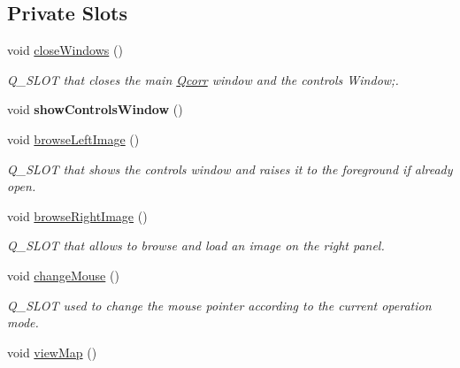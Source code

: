 \subsection*{Private Slots}
\begin{DoxyCompactItemize}
\item 
\hypertarget{classQcorr_a395de1dc21d85fa766fb6558c5e302e5}{
void \hyperlink{classQcorr_a395de1dc21d85fa766fb6558c5e302e5}{closeWindows} ()}
\label{classQcorr_a395de1dc21d85fa766fb6558c5e302e5}

\begin{DoxyCompactList}\small\item\em Q\_\-SLOT that closes the main \hyperlink{classQcorr}{Qcorr} window and the controls Window;. \item\end{DoxyCompactList}\item 
\hypertarget{classQcorr_a01b57fcc6bedf40f5c175c3fb4667a94}{
void {\bfseries showControlsWindow} ()}
\label{classQcorr_a01b57fcc6bedf40f5c175c3fb4667a94}

\item 
void \hyperlink{classQcorr_adb32e7bfe6afb84f306a9eb5bcd9b322}{browseLeftImage} ()
\begin{DoxyCompactList}\small\item\em Q\_\-SLOT that shows the controls window and raises it to the foreground if already open. \item\end{DoxyCompactList}\item 
\hypertarget{classQcorr_a60583105115d8d14c5fa2a959dc0f285}{
void \hyperlink{classQcorr_a60583105115d8d14c5fa2a959dc0f285}{browseRightImage} ()}
\label{classQcorr_a60583105115d8d14c5fa2a959dc0f285}

\begin{DoxyCompactList}\small\item\em Q\_\-SLOT that allows to browse and load an image on the right panel. \item\end{DoxyCompactList}\item 
\hypertarget{classQcorr_a3f27a3e9b548f80998a0266c9c4165a8}{
void \hyperlink{classQcorr_a3f27a3e9b548f80998a0266c9c4165a8}{changeMouse} ()}
\label{classQcorr_a3f27a3e9b548f80998a0266c9c4165a8}

\begin{DoxyCompactList}\small\item\em Q\_\-SLOT used to change the mouse pointer according to the current operation mode. \item\end{DoxyCompactList}\item 
\hypertarget{classQcorr_a3275244fd6183a4fef92b85578fea864}{
void \hyperlink{classQcorr_a3275244fd6183a4fef92b85578fea864}{viewMap} ()}
\label{classQcorr_a3275244fd6183a4fef92b85578fea864}


\end{DoxyCompactItemize}
